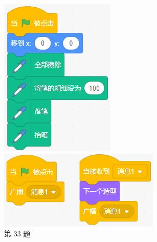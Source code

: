 \documentclass[10pt, a4paper]{article}
\begin{document}
    \begin{figure}[htbp]
        \centering
        \begin{minipage}[t]{.13\textwidth}
            \centering
            \includegraphics[width=\textwidth]{figure/33.png}
            \caption*{第 33 题}
        \end{minipage}
        \begin{minipage}[t]{.3\textwidth}
            \centering
            \includegraphics[width=\textwidth]{figure/34.png}

\end{minipage}
\end{figure}
\end{document}
